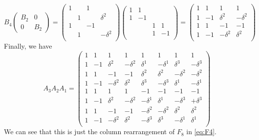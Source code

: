 \[
    B_4 \begin{pmatrix}
        B_2 & 0 \\
        0 & B_2
    \end{pmatrix} = \begin{pmatrix}
        1& & 1& \\
        & 1& & \delta^2\\
        1& & -1& \\
        & 1& & -\delta^2\\
    \end{pmatrix} \begin{pmatrix}
        1&1 & & \\
        1&-1 & & \\
        & & 1&1 \\
        & & 1&-1\\
    \end{pmatrix} = \begin{pmatrix}
        1& 1& 1& 1\\  
        1& -1& \delta^2& -\delta^2\\
        1& 1& -1& -1\\
        1& -1& -\delta^2& \delta^2\\
    \end{pmatrix}
\]
Finally, we have \[
    A_3 A_2 A_1 = \begin{pmatrix}
        1 & 1 & 1 & 1 & 1 & 1 & 1 & 1 \\
        1 & -1 & \delta^2 & -\delta^2 & \delta^1 & -\delta^1 & \delta^3 & -\delta^3 \\
        1 & 1 & -1 & -1 & \delta^2 & \delta^2 & -\delta^2 & -\delta^2 \\
        1 & -1 & -\delta^2 & \delta^2 & \delta^3 & -\delta^3 & \delta^1 & -\delta^1 \\
        1 & 1 & 1 & 1 & -1 & -1 & -1 & -1 \\
        1 & -1 & \delta^2 & -\delta^2 & -\delta^1 & \delta^1 & -\delta^3 & +\delta^3 \\
        1 & 1 & -1 & -1 & -\delta^2 & -\delta^2 & \delta^2 & \delta^2 \\
        1 & -1 & -\delta^2 & \delta^2 & -\delta^3 & \delta^3 & -\delta^1 & \delta^1 \\
    \end{pmatrix}
\]
We can see that this is just the column rearrangement of $F_8$ in \eqref{eq:F4}.

\newpage

